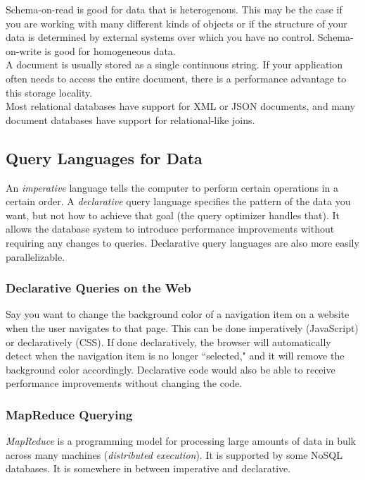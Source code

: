 \documentclass[12pt, titlepage]{article}
\begin{document}
Schema-on-read is good for data that is heterogenous. This may be the case if you are working with many different kinds of objects or if the structure of your data is determined by external systems over which you have no control. Schema-on-write is good for homogeneous data. \\

A document is usually stored as a single continuous string. If your application often needs to access the entire document, there is a performance advantage to this storage locality. \\

Most relational databases have support for XML or JSON documents, and many document databases have support for relational-like joins.

\subsection{Query Languages for Data}

An \textit{imperative} language tells the computer to perform certain operations in a certain order. A \textit{declarative} query language specifies the pattern of the data you want, but not how to achieve that goal (the query optimizer handles that). It allows the database system to introduce performance improvements without requiring any changes to queries. Declarative query languages are also more easily parallelizable. \\

\subsubsection{Declarative Queries on the Web}

Say you want to change the background color of a navigation item on a website when the user navigates to that page. This can be done imperatively (JavaScript) or declaratively (CSS). If done declaratively, the browser will automatically detect when the navigation item is no longer ``selected," and it will remove the background color accordingly. Declarative code would also be able to receive performance improvements without changing the code.

\subsubsection{MapReduce Querying}

\textit{MapReduce} is a programming model for processing large amounts of data in bulk across many machines (\textit{distributed execution}). It is supported by some NoSQL databases. It is somewhere in between imperative and declarative. \\
\end{document}
